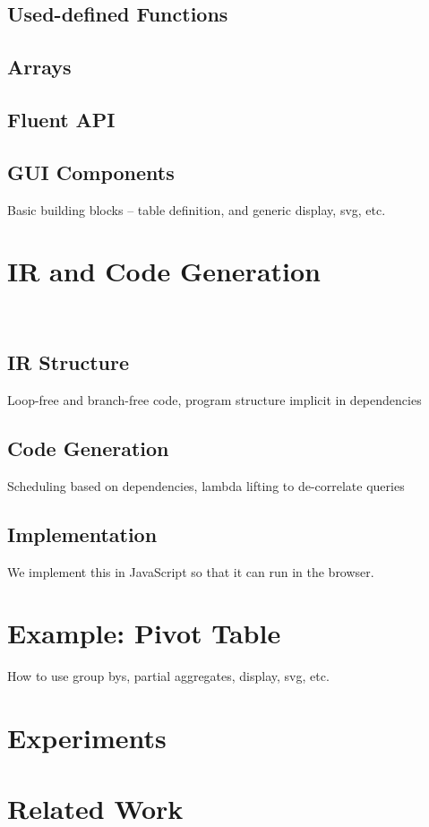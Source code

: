 \documentclass[runningheads]{llncs}
\begin{document}
\subsection{Used-defined Functions}
\subsection{Arrays}
\subsection{Fluent API}

\subsection{GUI Components}
Basic building blocks -- table definition, and generic display, svg, etc. 

\section{IR and Code Generation}~\label{sec:ir_codegen}
\subsection{IR Structure}
Loop-free and branch-free code, program structure implicit in dependencies

\subsection{Code Generation}
Scheduling based on dependencies, lambda lifting to de-correlate queries

\subsection{Implementation}
We implement this in JavaScript so that it can run in the browser.


\section{Example: Pivot Table}\label{sec:case_study}
How to use group bys, partial aggregates, display, svg, etc.

\section{Experiments}\label{sec:experiments}


\section{Related Work}\label{sec:related_work}
\end{document}
